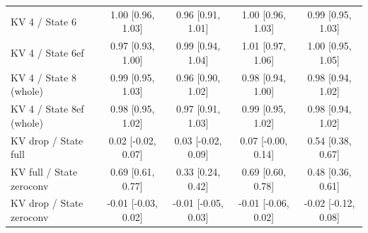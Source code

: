 \begin{tabular}{lcccc}
KV 4 / State 6 & 1.00 {\scriptsize[0.96, 1.03]} & 0.96 {\scriptsize[0.91, 1.01]} & 1.00 {\scriptsize[0.96, 1.03]} & 0.99 {\scriptsize[0.95, 1.03]} \\
KV 4 / State 6ef & 0.97 {\scriptsize[0.93, 1.00]} & 0.99 {\scriptsize[0.94, 1.04]} & 1.01 {\scriptsize[0.97, 1.06]} & 1.00 {\scriptsize[0.95, 1.05]} \\
KV 4 / State 8 (whole) & 0.99 {\scriptsize[0.95, 1.03]} & 0.96 {\scriptsize[0.90, 1.02]} & 0.98 {\scriptsize[0.94, 1.00]} & 0.98 {\scriptsize[0.94, 1.02]} \\
KV 4 / State 8ef (whole) & 0.98 {\scriptsize[0.95, 1.02]} & 0.97 {\scriptsize[0.91, 1.03]} & 0.99 {\scriptsize[0.95, 1.02]} & 0.98 {\scriptsize[0.94, 1.02]} \\
KV drop / State full & 0.02 {\scriptsize[-0.02, 0.07]} & 0.03 {\scriptsize[-0.02, 0.09]} & 0.07 {\scriptsize[-0.00, 0.14]} & 0.54 {\scriptsize[0.38, 0.67]} \\
KV full / State zeroconv & 0.69 {\scriptsize[0.61, 0.77]} & 0.33 {\scriptsize[0.24, 0.42]} & 0.69 {\scriptsize[0.60, 0.78]} & 0.48 {\scriptsize[0.36, 0.61]} \\
KV drop / State zeroconv & -0.01 {\scriptsize[-0.03, 0.02]} & -0.01 {\scriptsize[-0.05, 0.03]} & -0.01 {\scriptsize[-0.06, 0.02]} & -0.02 {\scriptsize[-0.12, 0.08]} \\
\bottomrule
\end{tabular}
